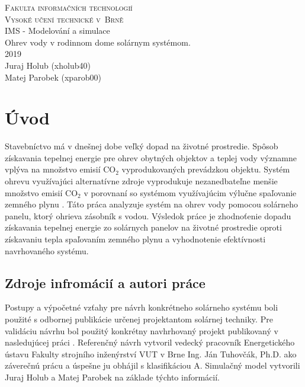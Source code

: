 \documentclass[a4paper, 11pt]{article}
\begin{document}
\begin{titlepage}
	\begin{center}
		\Huge
		\textsc{Fakulta informačních technologií \\
			Vysoké učení technické v~Brně} \\
		{\LARGE
			IMS - Modelování a simulace \\ 
			\medskip 
			\Large{
				Ohrev vody v rodinnom dome solárnym systémom.
			}
			}
		\setlength{\parindent}{0.3em}\\
		{\Large 2019} \\
		{\Large Juraj Holub (xholub40)}\\
		{\Large Matej Parobek (xparob00)}
	\end{center}
\end{titlepage}

\tableofcontents
\newpage

\section{Úvod}
Stavebníctvo má v dnešnej dobe veľký dopad na životné prostredie. Spôsob získavania tepelnej energie pre ohrev obytných objektov a teplej vody významne vplýva na množstvo emisií CO$_2$ vyprodukovaných prevádzkou objektu. Systém ohrevu využívajúci alternatívne zdroje vyprodukuje nezanedbateľne menšie množstvo emisií CO$_2$ v porovnaní so systémom využívajúcim výlučne spaľovanie zemného plynu . Táto práca analyzuje systém na ohrev vody pomocou solárneho panelu, ktorý ohrieva zásobník s vodou. Výsledok práce je zhodnoťenie dopadu získavania tepelnej energie zo solárnych panelov na životné prostredie oproti získavaniu tepla spaľovaním zemného plynu a vyhodnotenie efektívnosti navrhovaného systému. 

\subsection{Zdroje infromácií a autori práce}
Postupy a výpočetné vzťahy pre návrh konkrétneho solárneho systému boli použité s odbornej publikácie \cite{Cihelka} určenej projektantom solárnej techniky. Pre validáciu návrhu bol použitý konkrétny navhrhovaný projekt publikovaný v nasledujúcej práci \cite{bc_solar_system}. Referenčný návrh vytvoril vedecký pracovník Energetického ústavu Fakulty strojního inženýrství VUT v Brne Ing. Ján Tuhovčák, Ph.D. ako záverečnú prácu a úspešne ju obhájil s klasifikáciou A. Simulačný model vytvorili Juraj Holub a Matej Parobek na základe týchto informácií. 
\end{document}
